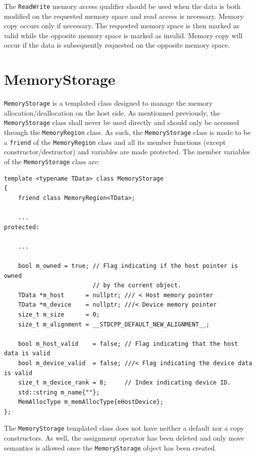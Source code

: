 The \lstinline[style=C++Style]!ReadWrite! memory access qualifier should be used when the data is both modified on the requested memory space and read access is necessary. Memory copy occurs only if necessary. The requested memory space is then marked as valid while the opposite memory space is marked as invalid. Memory copy will occur if the data is subsequently requested on the opposite memory space.

\section{MemoryStorage}
\lstinline[style=C++Style]!MemoryStorage! is a templated class designed to manage the memory allocation/deallocation on the host side. As mentionned previously, the \lstinline[style=C++Style]!MemoryStorage! class shall never be used directly and should only be accessed through the \lstinline[style=C++Style]!MemoryRegion! class. As such, the \lstinline[style=C++Style]!MemoryStorage! class is made to be a \lstinline[style=C++Style]!friend! of the \lstinline[style=C++Style]!MemoryRegion! class and all its member functions (except constructor/destructor) and variables are made protected. The member variables of the  \lstinline[style=C++Style]!MemoryStorage! class are:

\begin{lstlisting}[style=C++Style]
template <typename TData> class MemoryStorage
{
    friend class MemoryRegion<TData>;                                               

    ...
protected:

    ...

    bool m_owned = true; // Flag indicating if the host pointer is owned
                         // by the current object.
    TData *m_host      = nullptr; /// < Host memory pointer
    TData *m_device    = nullptr; ///< Device memory pointer
    size_t m_size      = 0;
    size_t m_alignment = __STDCPP_DEFAULT_NEW_ALIGNMENT__;

    bool m_host_valid    = false; // Flag indicating that the host data is valid
    bool m_device_valid  = false; ///< Flag indicating the device data is valid
    size_t m_device_rank = 0;     // Index indicating device ID.
    std::string m_name{""};
    MemAllocType m_memAllocType{eHostDevice};
};
\end{lstlisting}

The \lstinline[style=C++Style]!MemoryStorage! templated class does not have neither a default nor a copy constructors. As well, the assignment operator has been deleted and only move semantics is allowed once the \lstinline[style=C++Style]!MemoryStorage! object has been created.

